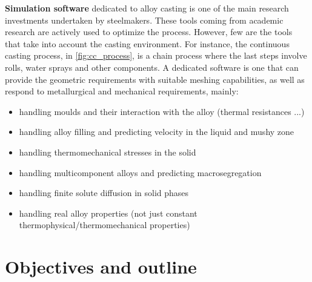 \textbf{Simulation software} dedicated to alloy casting is one of the main research investments undertaken by steelmakers. These tools coming from academic research
are actively used to optimize the process. However, few are the tools that take into account the casting environment. For instance, the continuous casting process, in
\cref{fig:cc_process}, is a chain process where the last steps involve rolls, water sprays and other components. A dedicated software is one that can provide the
geometric requirements with suitable meshing capabilities, as well as respond to metallurgical and mechanical requirements, mainly:
\begin{itemize}
\item handling moulds and their interaction with the alloy (thermal resistances ...)
\item handling alloy filling and predicting velocity in the liquid and mushy zone
\item handling thermomechanical stresses in the solid
\item handling multicomponent alloys and predicting macrosegregation
\item handling finite solute diffusion in solid phases
\item handling real alloy properties (not just constant thermophysical/thermomechanical properties)
\end{itemize}
\section{Objectives and outline}
